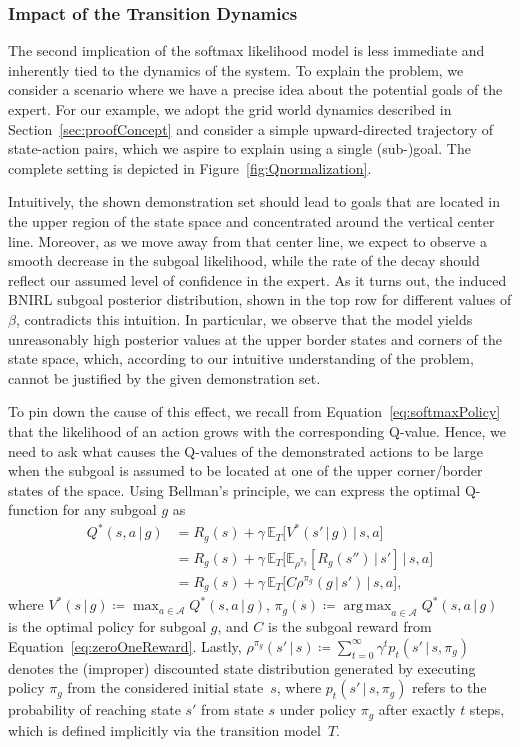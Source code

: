 \documentclass[twoside,11pt]{article}
\newcommand{\given}{\,\vert\,}
\newcommand{\E}{\mathbb{E}}
\DeclareMathOperator*{\argmax}{arg\,max}
\newcommand{\defeq}{\coloneqq}
\newcommand{\eqkomma}{,}
\begin{document}
\subsubsection{Impact of the Transition Dynamics}
\label{sec:impactOfTransitionModel}
The second implication of the softmax likelihood model is %
less immediate and %
inherently %
tied to the dynamics of the system. To explain the problem, we consider a %
scenario where we have a %
precise idea about the potential goals of the expert. 
%
For our example, we adopt the grid world dynamics described in Section~\ref{sec:proofConcept} and consider a simple upward-directed trajectory of state-action pairs, which we aspire to explain using a single \mbox{(sub-)goal}. The complete setting is depicted in Figure~\ref{fig:Qnormalization}. 

Intuitively, %
the shown demonstration set should %
lead to goals that are located in the upper region of the state space and concentrated around the vertical center line. Moreover, as we move %
away from that %
center line, we expect to observe a smooth decrease in the %
subgoal likelihood, while the rate of the decay should reflect our assumed level of confidence in the expert. As it turns out, the induced BNIRL subgoal posterior distribution, shown in the top row for different values of $\beta$, contradicts this intuition. In particular, we observe that the %
model yields unreasonably high posterior values at the upper border states and corners of the state space, which, according to our intuitive understanding of the problem, cannot be justified by the given demonstration set.


To pin down the cause of this effect, we recall from Equation~\eqref{eq:softmaxPolicy} that the likelihood of an action %
grows with the corresponding Q-value. %
Hence, we need to ask what causes the Q-values of the demonstrated actions to be large when the subgoal is assumed to be located at one of the upper corner/border states of the space. Using Bellman's principle, we can express the optimal Q-function for any subgoal $g$ %
as
%
%
%
%
%
%
\begin{align}
	Q^{*}(s,a \given g) &= R_g(s) + \gamma\,\E_T\big[V^{*}(s' \given g) \given s, a\big] \nonumber \\
	&= R_g(s) + \gamma\,\E_T\big[\E_{\rho^{\pi_g}}[R_g(s'') \given s'] \given s, a \big] \label{eq:improperBellman} \\
	&= R_g(s) + \gamma\,\E_T\big[C \rho^{\pi_g}(g \given s') \given s, a\big] \nonumber \eqkomma
\end{align}
where $V^{*}(s \given g) \defeq \max_{a\in\mathcal{A}} Q^{*}(s ,a \given g) $, $\pi_g (s) \defeq \argmax_{a\in\mathcal{A}} Q^*(s,a \given g)$ is the optimal policy for subgoal $g$, and $C$ is the subgoal reward from Equation~\eqref{eq:zeroOneReward}. Lastly, $\rho^{\pi_g}(s' \given s) \defeq \sum_{t=0}^\infty \gamma^t p_t(s' \given s, \pi_g)$ denotes the (improper) discounted state distribution generated by executing policy $\pi_g$ from the considered initial state~$s$, where $p_t(s' \given s, \pi_g)$ refers to the probability of reaching state $s'$ from state $s$ under policy $\pi_g$ after exactly $t$ steps, which is defined implicitly via the transition model~$T$. 
\end{document}

